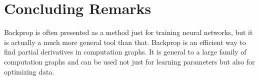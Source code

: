 






\section{Concluding Remarks}
Backprop is often presented as a method just for training neural networks, but it is actually a much more general tool than that. Backprop is an efficient way to find partial derivatives in computation graphs. It is general to a large family of computation graphs and can be used not just for learning parameters but also for optimizing data. %
